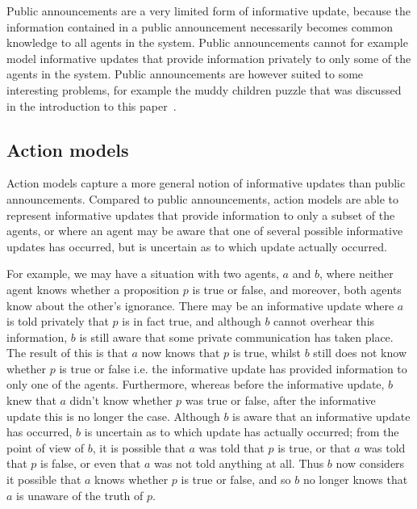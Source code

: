 Public announcements are a very limited form of informative update, because the
information contained in a public announcement necessarily becomes common
knowledge to all agents in the system. Public announcements cannot for example
model informative updates that provide information privately to only some of
the agents in the system. Public announcements are however suited to some
interesting problems, for example the muddy children puzzle that was discussed
in the introduction to this paper~\cite{vanditmarsch2007dynamic}.

\subsection{Action models}

Action models capture a more general notion of informative updates than public
announcements. Compared to public announcements, action models are able to
represent informative updates that provide information to only a subset of the
agents, or where an agent may be aware that one of several possible informative
updates has occurred, but is uncertain as to which update actually occurred. 

For example, we may have a situation with two agents, $a$ and $b$, where neither
agent knows whether a proposition $p$ is true or false, and moreover, both
agents know about the other's ignorance. There may be an informative update
where $a$ is told privately that $p$ is in fact true, and although $b$ cannot
overhear this information, $b$ is still aware that some private communication
has taken place. The result of this is that $a$ now knows that $p$ is true,
whilst $b$ still does not know whether $p$ is true or false i.e.  the
informative update has provided information to only one of the agents.
Furthermore, whereas before the informative update, $b$ knew that $a$ didn't
know whether $p$ was true or false, after the informative update this is no
longer the case. Although $b$ is aware that an informative update has
occurred, $b$ is uncertain as to which update has actually occurred; from the
point of view of $b$, it is possible that $a$ was told that $p$ is true, or that
$a$ was told that $p$ is false, or even that $a$ was not told anything at all.
Thus $b$ now considers it possible that $a$ knows whether $p$ is true or false,
and so $b$ no longer knows that $a$ is unaware of the truth of $p$.

